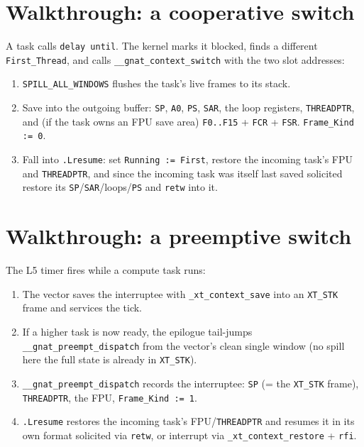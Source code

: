 \section{Walkthrough: a cooperative switch}

A task calls \texttt{delay until}. The kernel marks it blocked, finds a different
\texttt{First\_Thread}, and calls \texttt{\_\_gnat\_context\_switch} with the two
slot addresses:

\begin{enumerate}
  \item \texttt{SPILL\_ALL\_WINDOWS} flushes the task's live frames to its stack.
  \item Save into the outgoing buffer: \texttt{SP}, \texttt{A0}, \texttt{PS},
        \texttt{SAR}, the loop registers, \texttt{THREADPTR}, and (if the task owns
        an FPU save area) \texttt{F0..F15} + \texttt{FCR} + \texttt{FSR}.
        \texttt{Frame\_Kind := 0}.
  \item Fall into \texttt{.Lresume}: set \texttt{Running := First}, restore the
        incoming task's FPU and \texttt{THREADPTR}, and \textemdash{} since the
        incoming task was itself last saved solicited \textemdash{} restore its
        \texttt{SP}/\texttt{SAR}/loops/\texttt{PS} and \texttt{retw} into it.
\end{enumerate}

\section{Walkthrough: a preemptive switch}

The L5 timer fires while a compute task runs:

\begin{enumerate}
  \item The vector saves the interruptee with \texttt{\_xt\_context\_save} into an
        \texttt{XT\_STK} frame and services the tick.
  \item If a higher task is now ready, the epilogue tail-jumps
        \texttt{\_\_gnat\_preempt\_dispatch} from the vector's clean single window
        (no spill here \textemdash{} the full state is already in \texttt{XT\_STK}).
  \item \texttt{\_\_gnat\_preempt\_dispatch} records the interruptee:
        \texttt{SP} (= the \texttt{XT\_STK} frame), \texttt{THREADPTR}, the FPU,
        \texttt{Frame\_Kind := 1}.
  \item \texttt{.Lresume} restores the incoming task's FPU/\texttt{THREADPTR} and
        resumes it in its own format \textemdash{} solicited via \texttt{retw}, or
        interrupt via \texttt{\_xt\_context\_restore} + \texttt{rfi}.
\end{enumerate}

